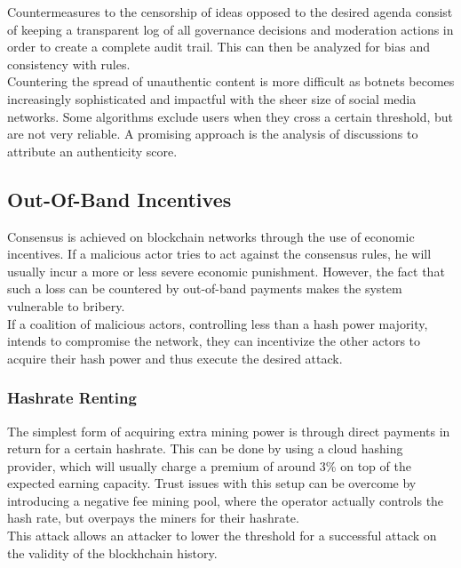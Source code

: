 \documentclass[12pt,a4paper]{article}
\begin{document}
Countermeasures to the censorship of ideas opposed to the desired agenda consist of keeping a transparent log of all governance decisions and moderation actions in order to create a complete audit trail. This can then be analyzed for bias and consistency with rules.\\

Countering the spread of unauthentic content is more difficult as botnets becomes increasingly sophisticated and impactful with the sheer size of social media networks. Some algorithms exclude users when they cross a certain threshold, but are not very reliable. A promising approach is the analysis of discussions to attribute an authenticity score.\\

\subsection{Out-Of-Band Incentives}

Consensus is achieved on blockchain networks through the use of economic incentives. If a malicious actor tries to act against the consensus rules, he will usually incur a more or less severe economic punishment. However, the fact that such a loss can be countered by out-of-band payments makes the system vulnerable to bribery.\\

If a coalition of malicious actors, controlling less than a hash power majority, intends to compromise the network, they can incentivize the other actors to acquire their hash power and thus execute the desired attack.\\

\subsubsection{Hashrate Renting}

The simplest form of acquiring extra mining power is through direct payments in return for a certain hashrate. This can be done by using a cloud hashing provider, which will usually charge a premium of around 3\% on top of the expected earning capacity. Trust issues with this setup can be overcome by introducing a negative fee mining pool, where the operator actually controls the hash rate, but overpays the miners for their hashrate.\\

This attack allows an attacker to lower the threshold for a successful attack on the validity of the blockhchain history.\\
\end{document}
